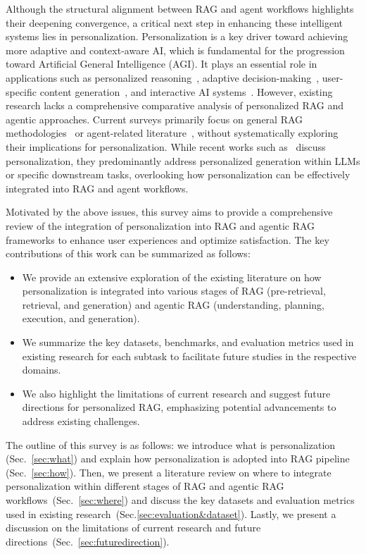 Although the structural alignment between RAG and agent workflows highlights their deepening convergence, a critical next step in enhancing these intelligent systems lies in personalization. Personalization is a key driver toward achieving more adaptive and context-aware AI, which is fundamental for the progression toward Artificial General Intelligence (AGI). It plays an essential role in applications such as personalized reasoning~\cite{xu2021transformer, henze2004reasoning}, adaptive decision-making~\cite{lu2011budgeted}, user-specific content generation~\cite{xu2025personalized, shaker2010towards}, and interactive AI systems~\cite{ma2021one, qian2021learning}. However, existing research lacks a comprehensive comparative analysis of personalized RAG and agentic approaches. Current surveys primarily focus on general RAG methodologies~\cite{gao2023retrieval, fan2024survey} or agent-related literature~\cite{li2024personal, wang2024survey, zhang2024survey}, without systematically exploring their implications for personalization. While recent works such as~\cite{zhang2024personalization, liu2025survey} discuss personalization, they predominantly address personalized generation within LLMs or specific downstream tasks, overlooking how personalization can be effectively integrated into RAG and agent workflows.

Motivated by the above issues, this survey aims to provide a comprehensive review of the integration of personalization into RAG and agentic RAG frameworks to enhance user experiences and optimize satisfaction. The key contributions of this work can be summarized as follows:
\begin{itemize}[leftmargin=*] 
\item We provide an extensive exploration of the existing literature on how personalization is integrated into various stages of RAG (pre-retrieval, retrieval, and generation) and agentic RAG (understanding, planning, execution, and generation).
\item We summarize the key datasets, benchmarks, and evaluation metrics used in existing research for each subtask to facilitate future studies in the respective domains. 
\item We also highlight the limitations of current research and suggest future directions for personalized RAG, emphasizing potential advancements to address existing challenges.
\end{itemize}


The outline of this survey is as follows: we introduce what is personalization (Sec.~\ref{sec:what}) and explain how personalization is adopted into RAG pipeline (Sec.~\ref{sec:how}). Then, we present a literature review on where to integrate personalization within different stages of RAG and agentic RAG workflows~(Sec.~\ref{sec:where}) and discuss the key datasets and evaluation metrics used in existing research~(Sec.\ref{sec:evaluation&dataset}). Lastly, we present a discussion on the limitations of current research and future directions~(Sec.~\ref{sec:futuredirection}).

